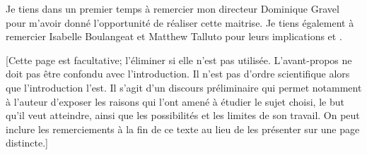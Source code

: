 

\Pagetitre
\cleardoublepage






\remerciements


Je tiens dans un premier temps à remercier mon directeur Dominique Gravel pour m'avoir donné l'opportunité de réaliser cette maitrise. Je tiens également à remercier Isabelle Boulangeat et Matthew Talluto pour leurs implications et .


\avantpropos


[Cette page est facultative; l’éliminer si elle n’est pas utilisée. L’avant-propos ne doit pas être confondu avec l'introduction. Il n’est pas d’ordre scientifique alors que l’introduction l’est. Il s’agit d'un discours préliminaire qui permet notamment à l'auteur d'exposer les raisons qui l'ont amené à étudier le sujet choisi, le but qu'il veut atteindre, ainsi que les possibilités et les limites de son travail. On peut inclure les remerciements à la fin de ce texte au lieu de les présenter sur une page distincte.]


